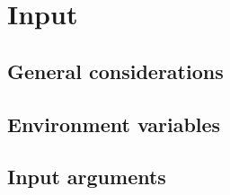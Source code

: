 \hypertarget{chap:input}{}
\chapter{Input}
\label{sec:input}
\chapterauthor{}


\section{General considerations}


\section{Environment variables}


\section{Input arguments}






